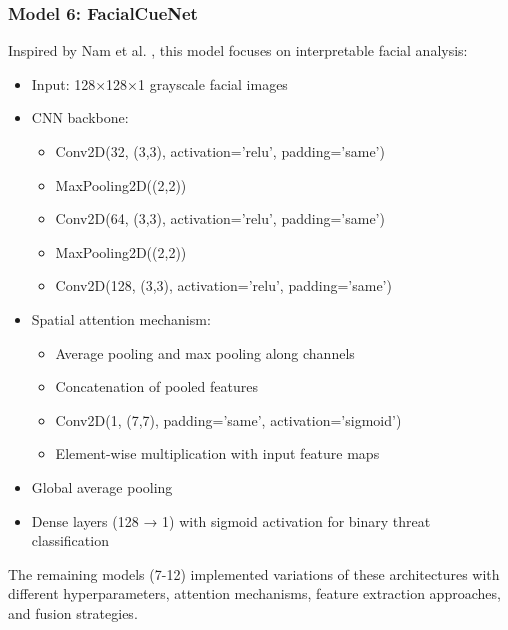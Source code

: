 \documentclass[conference,compsoc]{IEEEtran}
\begin{document}
\subsubsection{Model 6: FacialCueNet}
Inspired by Nam et al. \cite{nam2023}, this model focuses on interpretable facial analysis:
\begin{itemize}
    \item Input: 128×128×1 grayscale facial images
    \item CNN backbone:
        \begin{itemize}
            \item Conv2D(32, (3,3), activation='relu', padding='same')
            \item MaxPooling2D((2,2))
            \item Conv2D(64, (3,3), activation='relu', padding='same')
            \item MaxPooling2D((2,2))
            \item Conv2D(128, (3,3), activation='relu', padding='same')
        \end{itemize}
    \item Spatial attention mechanism:
        \begin{itemize}
            \item Average pooling and max pooling along channels
            \item Concatenation of pooled features
            \item Conv2D(1, (7,7), padding='same', activation='sigmoid')
            \item Element-wise multiplication with input feature maps
        \end{itemize}
    \item Global average pooling
    \item Dense layers (128 → 1) with sigmoid activation for binary threat classification
\end{itemize}

The remaining models (7-12) implemented variations of these architectures with different hyperparameters, attention mechanisms, feature extraction approaches, and fusion strategies.
\end{document}
